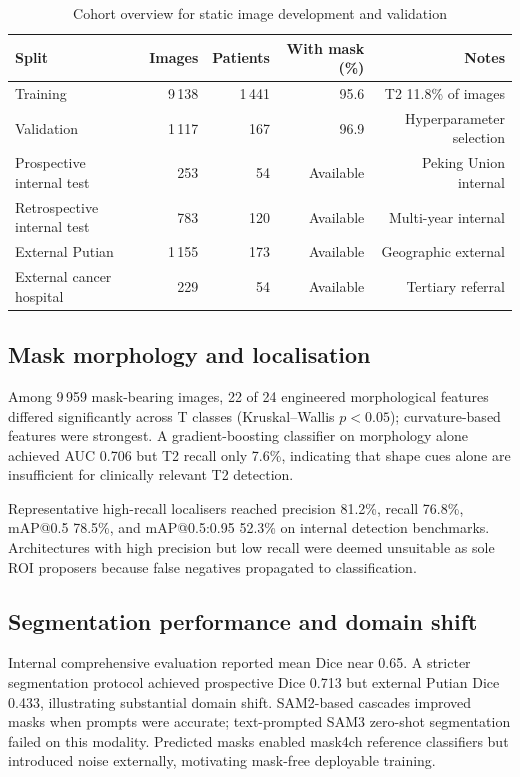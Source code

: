 \documentclass[11pt,a4paper]{article}
\begin{document}
\begin{table}[htbp]
\centering
\caption{Cohort overview for static image development and validation}
\label{tab:cohort}
\begin{tabular}{lrrrr}
\toprule
Split & Images & Patients & With mask (\%) & Notes \\
\midrule
Training & 9\,138 & 1\,441 & 95.6 & T2 11.8\% of images \\
Validation & 1\,117 & 167 & 96.9 & Hyperparameter selection \\
Prospective internal test & 253 & 54 & Available & Peking Union internal \\
Retrospective internal test & 783 & 120 & Available & Multi-year internal \\
External Putian & 1\,155 & 173 & Available & Geographic external \\
External cancer hospital & 229 & 54 & Available & Tertiary referral \\
\bottomrule
\end{tabular}
\end{table}

\subsection{Mask morphology and localisation}
Among 9\,959 mask-bearing images, 22 of 24 engineered morphological features differed significantly across T classes (Kruskal--Wallis $p{<}0.05$); curvature-based features were strongest. A gradient-boosting classifier on morphology alone achieved AUC 0.706 but T2 recall only 7.6\%, indicating that shape cues alone are insufficient for clinically relevant T2 detection.

Representative high-recall localisers reached precision 81.2\%, recall 76.8\%, mAP@0.5 78.5\%, and mAP@0.5:0.95 52.3\% on internal detection benchmarks. Architectures with high precision but low recall were deemed unsuitable as sole ROI proposers because false negatives propagated to classification.

\subsection{Segmentation performance and domain shift}
Internal comprehensive evaluation reported mean Dice near 0.65. A stricter segmentation protocol achieved prospective Dice 0.713 but external Putian Dice 0.433, illustrating substantial domain shift. SAM2-based cascades improved masks when prompts were accurate; text-prompted SAM3 zero-shot segmentation failed on this modality. Predicted masks enabled mask4ch reference classifiers but introduced noise externally, motivating mask-free deployable training.
\end{document}
